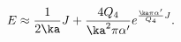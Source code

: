 \begin{equation}
E \approx \frac{1}{2\ka}J + \frac{4Q_4}{\ka^2\pi\alpha'}
e^{\frac{\ka\pi\alpha'}{Q_4}J}.
\label{lon}\end{equation}

